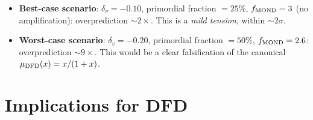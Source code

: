 \documentclass[11pt,a4paper]{article}
\newcommand{\mufd}{\mu_{\rm DFD}}
\begin{document}
\begin{tcolorbox}[colback=orange!5!white, colframe=red!60!black,
  title=\textbf{DEFINITIVE T4 ASSESSMENT}]
\begin{itemize}
\item \textbf{Best-case scenario}: $\delta_v = -0.10$, primordial
  fraction $= 25\%$, $f_{\rm MOND} = 3$ (no amplification):
  overprediction $\sim 2\times$. This is a \emph{mild tension},
  within $\sim 2\sigma$.

\item \textbf{Worst-case scenario}: $\delta_v = -0.20$, primordial
  fraction $= 50\%$, $f_{\rm MOND} = 2.6$:
  overprediction $\sim 9\times$. This would be a clear falsification
  of the canonical $\mufd(x) = x/(1+x)$.
\end{itemize}

\end{tcolorbox}

\section{Implications for DFD}
\end{document}
